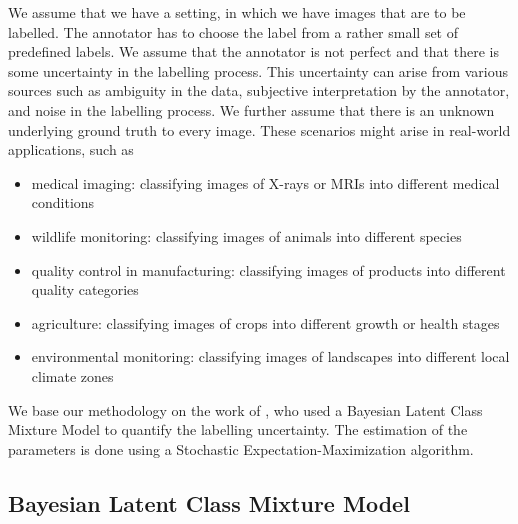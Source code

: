 We assume that we have a setting, in which we have images that are to be
labelled. The annotator has to choose the label from a rather small set of
predefined labels. We assume that the annotator is not perfect and that there is
some uncertainty in the labelling process. This uncertainty can arise from
various sources such as ambiguity in the data, subjective interpretation by the
annotator, and noise in the labelling process. We further assume that there is
an unknown underlying ground truth to every image. These scenarios might arise in
real-world applications, such as
\begin{itemize}
    \item medical imaging: classifying images of X-rays or MRIs into different medical conditions
    \item wildlife monitoring: classifying images of animals into different species
    \item quality control in manufacturing: classifying images of products into different quality categories
    \item agriculture: classifying images of crops into different growth or health stages
    \item environmental monitoring: classifying images of landscapes into different local climate zones
\end{itemize}

We base our methodology on the work of
\cite{hechingerCategorisingWorldLocal2024}, who used a Bayesian Latent Class
Mixture Model to quantify the labelling uncertainty. The estimation of
the parameters is done using a Stochastic Expectation-Maximization
algorithm.

\subsection{Bayesian Latent Class Mixture Model}
\label{BLCMM}


